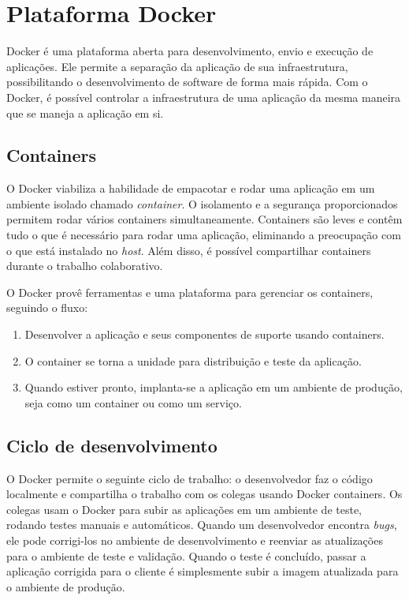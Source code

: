 \section{Plataforma Docker}

Docker é uma plataforma aberta para desenvolvimento, envio e execução de aplicações. Ele permite a separação da aplicação de sua infraestrutura, possibilitando o desenvolvimento de software de forma mais rápida. Com o Docker, é possível controlar a infraestrutura de uma aplicação da mesma maneira que se maneja a aplicação em si.

\subsection{Containers}

O Docker viabiliza a habilidade de empacotar e rodar uma aplicação em um ambiente isolado chamado \textit{container}. O isolamento e a segurança proporcionados permitem rodar vários containers simultaneamente. Containers são leves e contêm tudo o que é necessário para rodar uma aplicação, eliminando a preocupação com o que está instalado no \textit{host}. Além disso, é possível compartilhar containers durante o trabalho colaborativo.

O Docker provê ferramentas e uma plataforma para gerenciar os containers, seguindo o fluxo:

\begin{enumerate}
    \item Desenvolver a aplicação e seus componentes de suporte usando containers.
    \item O container se torna a unidade para distribuição e teste da aplicação.
    \item Quando estiver pronto, implanta-se a aplicação em um ambiente de produção, seja como um container ou como um serviço.
\end{enumerate}

\subsection{Ciclo de desenvolvimento}

O Docker permite o seguinte ciclo de trabalho: o desenvolvedor faz o código localmente e compartilha o trabalho com os colegas usando Docker containers. Os colegas usam o Docker para subir as aplicações em um ambiente de teste, rodando testes manuais e automáticos. Quando um desenvolvedor encontra \textit{bugs}, ele pode corrigi-los no ambiente de desenvolvimento e reenviar as atualizações para o ambiente de teste e validação. Quando o teste é concluído, passar a aplicação corrigida para o cliente é simplesmente subir a imagem atualizada para o ambiente de produção.

